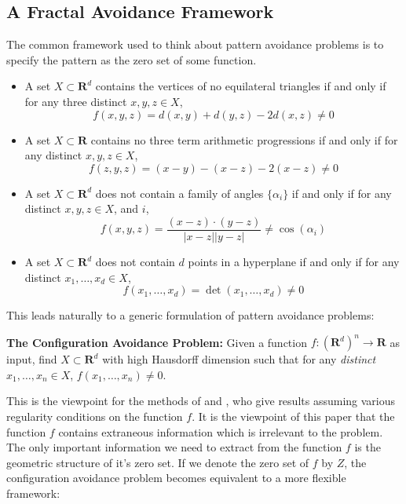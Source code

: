 \documentclass{article}
\theoremstyle{plain}
\theoremstyle{plain}
\begin{document}
\begin{multicols}{2}
\section{A Fractal Avoidance Framework}

The common framework used to think about pattern avoidance problems is to specify the pattern as the zero set of some function.
%
\begin{itemize}
	\item A set $X \subset \mathbf{R}^d$ contains the vertices of no equilateral triangles if and only if for any three distinct $x,y,z \in X$,
	\[ f(x,y,z) = d(x,y) + d(y,z) - 2d(x,z) \neq 0 \]

	\item A set $X \subset \mathbf{R}$ contains no three term arithmetic progressions if and only if for any distinct $x,y,z \in X$,
	\[ f(z,y,z) = (x - y) - (x - z) - 2(x - z) \neq 0 \]

	\item A set $X \subset \mathbf{R}^d$ does not contain a family of angles $\{ \alpha_i \}$ if and only if for any distinct $x,y,z \in X$, and $i$,
	\[ f(x,y,z) = \frac{(x - z) \cdot (y - z)}{|x - z||y - z|} \neq \cos(\alpha_i) \]

	\item A set $X \subset \mathbf{R}^d$ does not contain $d$ points in a hyperplane if and only if for any distinct $x_1, \dots, x_d \in X$,
	\[ f(x_1, \dots, x_d) = \det(x_1, \dots, x_d) \neq 0 \]
\end{itemize}
%
This leads naturally to a generic formulation of pattern avoidance problems:

\begin{changemargin}{0.5em}{0em}
{\bf The Configuration Avoidance Problem:} Given a function $f: (\mathbf{R}^d)^n \to \mathbf{R}$ as input, find $X \subset \mathbf{R}^d$ with high Hausdorff dimension such that for any {\it distinct} $x_1, \dots, x_n \in X$, $f(x_1, \dots, x_n) \neq 0$.
\end{changemargin}

This is the viewpoint for the methods of \cite{MalabikaRob} and \cite{Mathe}, who give results assuming various regularity conditions on the function $f$. It is the viewpoint of this paper that the function $f$ contains extraneous information which is irrelevant to the problem. The only important information we need to extract from the function $f$ is the geometric structure of it's zero set. If we denote the zero set of $f$ by $Z$, the configuration avoidance problem becomes equivalent to a more flexible framework:


\end{multicols}
\end{document}
